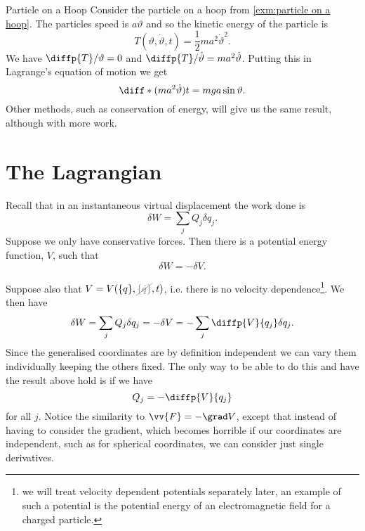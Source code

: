 \documentclass[fleqn]{NotesClass}
\newcommand*{\nodependence}[1]{\textcolor{gray}{\cancel{#1}}}
\begin{document}
    \begin{exm}{Particle on a Hoop}{}
        Consider the particle on a hoop from \cref{exm:particle on a hoop}.
        The particles speed is \(a\dot{\vartheta}\) and so the kinetic energy of the particle is
        \begin{equation}
            T(\vartheta, \dot{\vartheta}, t) = \frac{1}{2}ma^2 \dot{\vartheta}^2.
        \end{equation}
        We have \(\diffp{T}/{\vartheta} = 0\) and \(\diffp{T}/{\dot{\vartheta}} = ma^2\dot{\vartheta}\).
        Putting this in Lagrange's equation of motion we get
        \begin{equation}
            \diff*{(ma^2\dot{\vartheta})}{t} = mga\sin\vartheta.
        \end{equation}
        Other methods, such as conservation of energy, will give us the same result, although with more work.
    \end{exm}
    
    \section{The Lagrangian}\label{sec:the lagrangian}
    Recall that in an instantaneous virtual displacement the work done is
    \begin{equation}
        \delta W = \sum_j Q_j \delta q_j.
    \end{equation}
    Suppose we only have conservative forces.
    Then there is a potential energy function, \(V\), such that
    \begin{equation}
        \delta W = -\delta V.
    \end{equation}
    
    Suppose also that \(V = V(\{q\}, \nodependence{\{\dot{q}\}}, t)\), i.e. there is no velocity dependence\footnote{we will treat velocity dependent potentials separately later, an example of such a potential is the potential energy of an electromagnetic field for a charged particle.}.
    We then have
    \begin{equation}
        \delta W = \sum_j Q_j \delta q_j = -\delta V = -\sum_j \diffp{V}{q_j}\delta q_j.
    \end{equation}
    Since the generalised coordinates are by definition independent we can vary them individually keeping the others fixed.
    The only way to be able to do this and have the result above hold is if we have
    \begin{equation}
        Q_j = -\diffp{V}{q_j}
    \end{equation}
    for all \(j\).
    Notice the similarity to \(\vv{F} = -\grad V\), except that instead of having to consider the gradient, which becomes horrible if our coordinates are independent, such as for spherical coordinates, we can consider just single derivatives.
    
\end{document}
